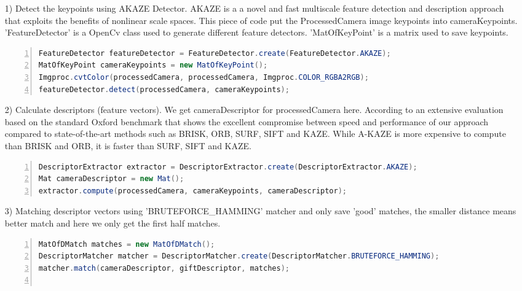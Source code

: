 \begin{enumerate}
\item[1)] Detect the keypoints using AKAZE Detector. AKAZE is a a novel and fast multiscale feature detection and description approach that exploits the benefits of nonlinear scale spaces.\cite{alcantarilla2011fast} This piece of code put the ProcessedCamera image keypoints into cameraKeypoints. 'FeatureDetector' is a OpenCv class used to generate different feature detectors. 'MatOfKeyPoint' is a matrix used to save keypoints.
\begin{lstlisting}[language={java},
        numbers=left,basicstyle=\small\ttfamily,breaklines=true]
FeatureDetector featureDetector = FeatureDetector.create(FeatureDetector.AKAZE);
MatOfKeyPoint cameraKeypoints = new MatOfKeyPoint();
Imgproc.cvtColor(processedCamera, processedCamera, Imgproc.COLOR_RGBA2RGB);
featureDetector.detect(processedCamera, cameraKeypoints);
\end{lstlisting} 
\item[2)] Calculate descriptors (feature vectors). We get cameraDescriptor for processedCamera here. According to an extensive evaluation based on the standard Oxford benchmark \cite{mikolajczyk2005} that shows the excellent compromise between speed and performance of our approach compared to state-of-the-art methods such as BRISK, ORB, SURF, SIFT and KAZE. While A-KAZE is more expensive to compute than BRISK and ORB, it is faster than SURF, SIFT and KAZE.\cite{alcantarilla2011fast}
\begin{lstlisting}[language={java},
        numbers=left,basicstyle=\small\ttfamily,breaklines=true]
DescriptorExtractor extractor = DescriptorExtractor.create(DescriptorExtractor.AKAZE);
Mat cameraDescriptor = new Mat();
extractor.compute(processedCamera, cameraKeypoints, cameraDescriptor);
\end{lstlisting} 
\item[3)] Matching descriptor vectors using 'BRUTEFORCE\_HAMMING' matcher and only save 'good' matches, the smaller distance means better match and here we only get the first half matches. 
\begin{lstlisting}[language={java},
        numbers=left,basicstyle=\small\ttfamily,breaklines=true]
MatOfDMatch matches = new MatOfDMatch();
DescriptorMatcher matcher = DescriptorMatcher.create(DescriptorMatcher.BRUTEFORCE_HAMMING);
matcher.match(cameraDescriptor, giftDescriptor, matches);
            

\end{lstlisting}
\end{enumerate}
